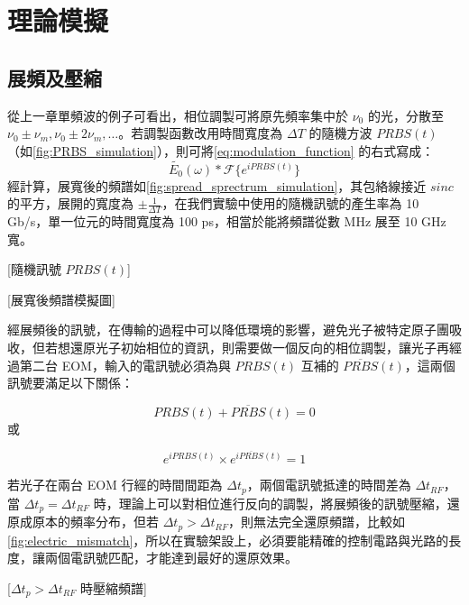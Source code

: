 \documentclass[class=NCU_thesis, crop=false]{standalone}
\begin{document}
\chapter{理論模擬}
\section{展頻及壓縮}
從上一章單頻波的例子可看出，相位調製可將原先頻率集中於 $\nu_{0}$ 的光，分散至 $\nu_{0}\pm\nu_{m}, \nu_{0}\pm2\nu_{m},\dots$。若調製函數改用時間寬度為 $\Delta T$ 的隨機方波 $PRBS(t)$ （如\cref{fig:PRBS_simulation}），則可將\cref{eq:modulation_function} 的右式寫成：
\begin{equation}
    \tilde{E_{0}}(\omega)*\mathscr{F}\{{e^{i PRBS(t)}}\}
\end{equation}
經計算，展寬後的頻譜如\cref{fig:spread_sprectrum_simulation}，其包絡線接近 $sinc$ 的平方，展開的寬度為 $\pm\frac{1}{\Delta T}$，在我們實驗中使用的隨機訊號的產生率為 10 Gb/s，單一位元的時間寬度為 100 ps，相當於能將頻譜從數 MHz 展至 10 GHz 寬。

[隨機訊號 $PRBS(t)$]

[展寬後頻譜模擬圖]

經展頻後的訊號，在傳輸的過程中可以降低環境的影響，避免光子被特定原子團吸收，但若想還原光子初始相位的資訊，則需要做一個反向的相位調製，讓光子再經過第二台 EOM，輸入的電訊號必須為與 $PRBS(t)$ 互補的 $\overline{PRBS}(t)$，這兩個訊號要滿足以下關係：

\begin{equation}
    \label{eq:prbs_condition}
    PRBS(t)+\overline{PRBS}(t)=0
\end{equation}
或

\begin{equation}
    e^{i PRBS(t)}\times e^{i \overline{PRBS}(t)}=1
\end{equation}

若光子在兩台 EOM 行經的時間間距為 $\Delta t_{p}$，兩個電訊號抵達的時間差為 $\Delta t_{RF}$，當 $\Delta t_{p}=\Delta t_{RF}$ 時，理論上可以對相位進行反向的調製，將展頻後的訊號壓縮，還原成原本的頻率分布，但若 $\Delta t_{p}>\Delta t_{RF}$，則無法完全還原頻譜，比較如\cref{fig:electric_mismatch}，所以在實驗架設上，必須要能精確的控制電路與光路的長度，讓兩個電訊號匹配，才能達到最好的還原效果。

[$\Delta t_{p}>\Delta t_{RF}$ 時壓縮頻譜]

\end{document}
